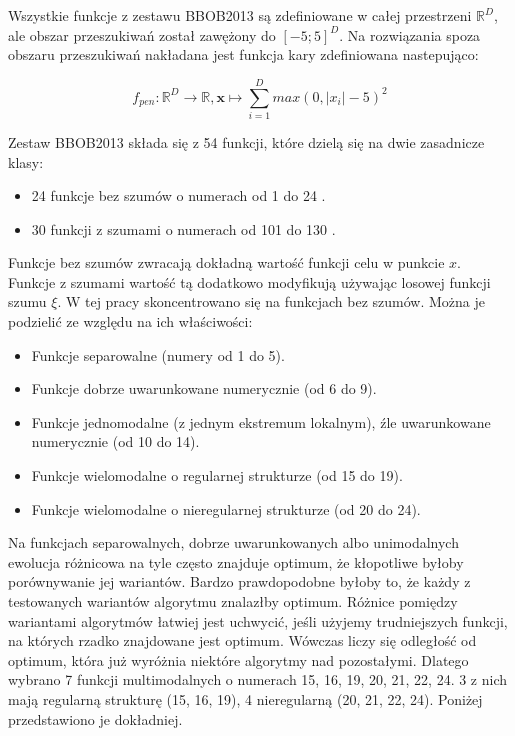 \documentclass[a4paper,onecolumn,oneside,11pt,wide,floatssmall]{mwrep}
\theoremstyle{definition}
\theoremstyle{plain}%
\theoremstyle{remark}
\begin{document}
Wszystkie funkcje z zestawu BBOB2013 są zdefiniowane w całej przestrzeni $\mathbb{R}^D$, ale obszar przeszukiwań został zawężony
do $[-5; 5]^D$. Na rozwiązania spoza obszaru przeszukiwań nakładana jest funkcja kary zdefiniowana nastepująco:

$$ f_{pen} : \mathbb{R}^D \rightarrow \mathbb{R}, \textbf{x} \mapsto \sum\limits_{i=1}^D max(0, |x_i| - 5)^2 $$

Zestaw BBOB2013 składa się z 54 funkcji, które dzielą się na dwie zasadnicze klasy:

\begin{itemize}
 \item 24 funkcje bez szumów o numerach od 1 do 24 \cite{noiseless}. 
 \item 30 funkcji z szumami o numerach od 101 do 130 \cite{noisy}.
\end{itemize} 

Funkcje bez szumów zwracają dokładną wartość funkcji celu w punkcie $x$. Funkcje z szumami wartość tą dodatkowo modyfikują używając 
losowej funkcji szumu $\xi$. W tej pracy skoncentrowano się na funkcjach bez szumów. Można je podzielić ze względu
na ich właściwości:

\begin{itemize}
 \item Funkcje separowalne (numery od 1 do 5).
 \item Funkcje dobrze uwarunkowane numerycznie (od 6 do 9).
 \item Funkcje jednomodalne (z jednym ekstremum lokalnym), źle uwarunkowane numerycznie (od 10 do 14).
 \item Funkcje wielomodalne o regularnej strukturze (od 15 do 19).
 \item Funkcje wielomodalne o nieregularnej strukturze (od 20 do 24).
\end{itemize} 

Na funkcjach separowalnych, dobrze uwarunkowanych albo unimodalnych ewolucja różnicowa na tyle często znajduje optimum, że kłopotliwe
byłoby porównywanie jej wariantów. Bardzo prawdopodobne byłoby to, że każdy z testowanych wariantów algorytmu znalazłby optimum. 
Różnice pomiędzy wariantami algorytmów łatwiej jest uchwycić, jeśli użyjemy trudniejszych funkcji, na których rzadko znajdowane jest 
optimum. Wówczas liczy się odległość od optimum, która już wyróżnia niektóre algorytmy nad pozostałymi. Dlatego wybrano 7 funkcji 
multimodalnych o numerach 15, 16, 19, 20, 21, 22, 24. 3 z nich mają regularną strukturę (15, 16, 19), 4 nieregularną (20, 21, 22, 24).
Poniżej przedstawiono je dokładniej.
\end{document}
